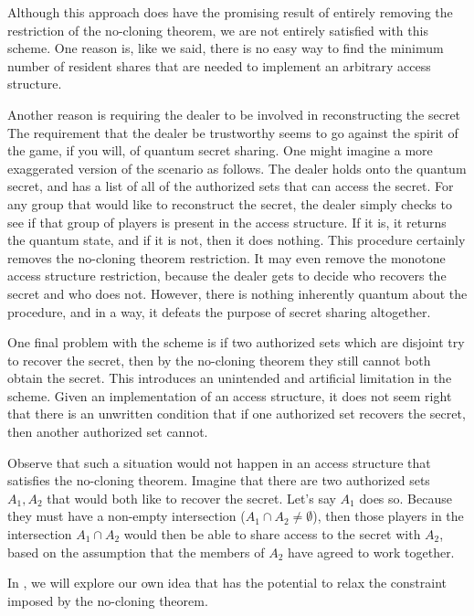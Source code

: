 Although this approach does have the promising result of entirely removing the restriction of the no-cloning theorem, we are not entirely satisfied with this scheme. One reason is, like we said, there is no easy way to find the minimum number of resident shares that are needed to implement an arbitrary access structure.

Another reason is requiring the dealer to be involved in reconstructing the secret The requirement that the dealer be trustworthy seems to go against the spirit of the game, if you will, of quantum secret sharing. One might imagine a more exaggerated version of the scenario as follows. The dealer holds onto the quantum secret, and has a list of all of the authorized sets that can access the secret. For any group that would like to reconstruct the secret, the dealer simply checks to see if that group of players is present in the access structure. If it is, it returns the quantum state, and if it is not, then it does nothing. This procedure certainly removes the no-cloning theorem restriction. It may even remove the monotone access structure restriction, because the dealer gets to decide who recovers the secret and who does not. However, there is nothing inherently quantum about the procedure, and in a way, it defeats the purpose of secret sharing altogether.

One final problem with the scheme is if two authorized sets which are disjoint try to recover the secret, then by the no-cloning theorem they still cannot both obtain the secret. This introduces an unintended and artificial limitation in the scheme. Given an implementation of an access structure, it does not seem right that there is an unwritten condition that if one authorized set recovers the secret, then another authorized set cannot. 

Observe that such a situation would not happen in an access structure that satisfies the no-cloning theorem. Imagine that there are two authorized sets $A_1,A_2$ that would both like to recover the secret. Let's say $A_1$ does so. Because they must have a non-empty intersection ($A_1 \cap A_2 \neq \emptyset$), then those players in the intersection $A_1 \cap A_2$ would then be able to share access to the secret with $A_2$, based on the assumption that the members of $A_2$ have agreed to work together.

In , we will explore our own idea that has the potential to relax the constraint imposed by the no-cloning theorem.
